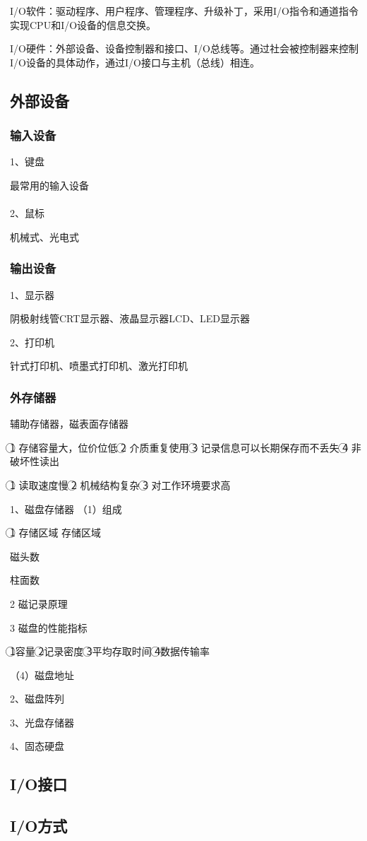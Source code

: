 \documentclass{ctexart}
\begin{document}
I/O软件：驱动程序、用户程序、管理程序、升级补丁，采用I/O指令和通道指令实现CPU和I/O设备的信息交换。

I/O硬件：外部设备、设备控制器和接口、I/O总线等。通过社会被控制器来控制I/O设备的具体动作，通过I/O接口与主机（总线）相连。

\subsection{外部设备}

\subsubsection{输入设备}
1、键盘

最常用的输入设备
\\\\

2、鼠标

机械式、光电式


\subsubsection{输出设备}

1、显示器

阴极射线管CRT显示器、液晶显示器LCD、LED显示器


2、打印机

针式打印机、喷墨式打印机、激光打印机

\subsubsection{外存储器}

辅助存储器，磁表面存储器

\textcircled{1} 存储容量大，位价位低
\textcircled{2} 介质重复使用
\textcircled{3} 记录信息可以长期保存而不丢失
\textcircled{4} 非破坏性读出

\textcircled{1} 读取速度慢
\textcircled{2} 机械结构复杂
\textcircled{3} 对工作环境要求高

1、磁盘存储器
（1）组成

\textcircled{1} 存储区域
存储区域

磁头数

柱面数

{2} 磁记录原理

{3 }磁盘的性能指标

\textcircled{1}容量
\textcircled{2}记录密度
\textcircled{3}平均存取时间
\textcircled{4}数据传输率

（4）磁盘地址

2、磁盘阵列

3、光盘存储器

4、固态硬盘

\subsection{I/O接口}

\subsection{I/O方式}
\end{document}
